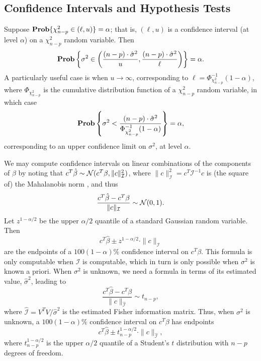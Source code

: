 \documentclass[12pt]{article}
\begin{document}
\subsection{Confidence Intervals and Hypothesis Tests \label{sec:CIHT}}
Suppose $\mathop{\bf Prob}\{ \chi_{n-p}^2 \in (\ell, u) \} = \alpha$; that is, $(\ell, u)$ is a confidence interval (at level $\alpha$) on a $\chi_{n-p}^2$ random variable. Then 
\begin{equation}\label{eqn:var_ci}
   \mathop{\bf Prob} \left\{ \sigma^2 \in \left( \frac{(n-p) \cdot \hat{\sigma}^2}{u}, \frac{(n-p) \cdot \hat{\sigma}^2}{\ell} \right) \right\} = \alpha.
\end{equation}
A particularly useful case is when $u \to \infty$, corresponding to $\ell = \Phi_{\chi_{n-p}^2}^{-1}(1 - \alpha)$, where $\Phi_{\chi_{n-p}^2}$ is the cumulative distribution function of a $\chi_{n-p}^2$ random variable, in which case 
\begin{displaymath}
   \mathop{\bf Prob}\left\{\sigma^2 < \frac{(n-p) \cdot \hat{\sigma}^2}{\Phi_{\chi_{n-p}^2}^{-1}(1 - \alpha)} \right\} = \alpha,
\end{displaymath}
corresponding to an upper confidence limit on $\sigma^2$, at level $\alpha$.

We may compute confidence intervals on linear combinations of the components of $\beta$ by noting that $c^T \hat{\beta} \sim {\mathcal N} (c^T \beta, \| c \|_\mathcal{I}^2)$, where $\| c \|_\mathcal{I}^2 = c^T \mathcal{I}^{-1} c$ is (the square of) the Mahalanobis norm \cite[\S~3.11.1]{Seber:2003}, and thus
\begin{equation}
\label{eqn:dist_ctbeta}
   \frac{c^T \hat{\beta} - c^T \beta}{\|c\|_\mathcal{I}} \sim {\mathcal N}(0, 1).
\end{equation}
Let $z^{1-\alpha/2}$ be the upper $\alpha/2$ quantile of a standard Gaussian random variable. Then
\begin{equation}
\label{eqn:ci_beta}
c^T \hat{\beta} \pm z^{1-\alpha/2} \cdot \|c\|_\mathcal{I}
\end{equation}
are the endpoints of a $100(1-\alpha)\%$ confidence interval on $c^T \beta$. This formula is only computable when $\mathcal{I}$ is computable, which in turn is only possible when $\sigma^2$ is known a priori. When $\sigma^2$ is unknown, we need a formula in terms of its estimated value, $\hat{\sigma}^2$, leading to
\begin{displaymath}
   \frac{c^T \hat{\beta} - c^T \beta}{\| c \|_{\hat{\mathcal{I}}}} \sim t_{n-p},
\end{displaymath}
where $\hat{\mathcal{I}} = V^T V / \hat{\sigma}^2$ is the estimated Fisher information matrix. Thus, when $\sigma^2$ is unknown, a $100(1-\alpha)\%$ confidence interval on $c^T \beta$ has endpoints
\begin{equation}
\label{eqn:ci_beta_estimated_variance}
c^T \hat{\beta} \pm t_{n-p}^{1-\alpha/2} \cdot \| c \|_{\hat{\mathcal{I}}},
\end{equation}
where $t_{n-p}^{1-\alpha/2}$ is the upper $\alpha/2$ quantile of a Student's $t$ distribution with $n-p$ degrees of freedom.
\end{document}
